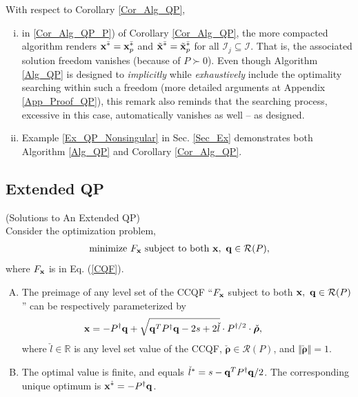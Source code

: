 \documentclass{imaman}
\newcommand{\beq}{\begin{eqnarray}}
\newcommand{\eeq}{\end{eqnarray}}
\newcommand{\bfx}{{\bf x}}
\newcommand{\bfq}{{\bf q}}
\newcommand{\bfrho}{{\boldsymbol \rho}}
\newcommand{\real}{\mathbb{R}}
\newcommand{\calI}{{\mathcal I}}
\newcommand{\calR}{{\mathcal R}}
\numberwithin{equation}{section}
\begin{document}
\begin{remark} With respect to Corollary \ref{Cor_Alg_QP},
\begin{enumerate}[i)]
\item\label{Rem_Cor_Alg_P_Nonsingular} in \ref{Cor_Alg_QP_P}) of Corollary \ref{Cor_Alg_QP}, the more compacted algorithm renders $\bfx^{\bar *}=\bfx_p^{\bar *}$ and $\tilde\bfx^{\bar *}=\tilde\bfx_p^{\bar *}$ for all $\calI_j\subseteq\calI$. That is, the associated solution freedom vanishes (because of $P\succ 0$). Even though Algorithm \ref{Alg_QP} is designed to \textit{implicitly} while \textit{exhaustively} include the optimality searching within such a freedom (more detailed arguments at Appendix \ref{App_Proof_QP}), this remark also reminds that the searching process, excessive in this case, automatically vanishes as well -- as designed.
\item Example \ref{Ex_QP_Nonsingular} in Sec. \ref{Sec_Ex} demonstrates both Algorithm \ref{Alg_QP} and Corollary \ref{Cor_Alg_QP}.
\end{enumerate}
\label{Rem_Cor_Alg}
\end{remark}

\vspace{-0.3cm}
\subsection{Extended QP}
\label{Subsec_Extended_QP}
\begin{theorem} (Solutions to An Extended QP)\\
Consider the optimization problem,
\beq
\mbox{minimize}~F_\bfx~\mbox{subject to both}~\bfx,~\bfq\in\calR(P),
\label{Problem_Extended_QP}
\eeq
where $F_\bfx$ is in Eq. {\rm(\ref{CQF})}.
\newpage\begin{enumerate}[A)]
\item\label{Thm_Extended_QP_Preimage} The preimage of any level set of the CCQF ``$F_\bfx$ subject to both $\bfx,~\bfq\in\calR(P)$'' can be respectively parameterized by
    \beq
    \bfx=-P^{\dagger}\bfq+\sqrt{\bfq^TP^\dagger\bfq-2s+2\check l}\cdot P^{\dagger/2}\cdot \check \bfrho,~~~~~~~~~
    \label{Thm_Extended_QP_Solutions}
    \eeq
    where $\check l\in\real$ is any level set value of the CCQF, $\check\bfrho\in \calR(P)$, and $\Vert\check\bfrho\Vert=1$.
\item\label{Thm_Extended_QP_Optimality} The optimal value is finite, and equals $\check l^*=s-\bfq^TP^\dagger\bfq/2$. The corresponding unique optimum is $\bfx^{\hat *}=-P^\dagger\bfq$.
\end{enumerate}
\label{Thm_Extended_QP}
\end{theorem}
\end{document}

